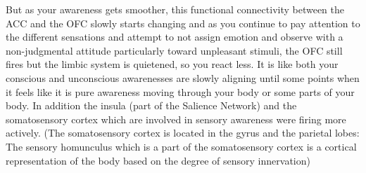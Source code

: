 \documentclass{article}
\begin{document}
But as your awareness gets smoother, this functional connectivity between the ACC and the OFC slowly starts changing and as you continue to pay attention to the different sensations and attempt to not assign emotion and observe with a non-judgmental attitude particularly toward unpleasant stimuli, the OFC still fires but the limbic system is quietened, so you react less. It is like both your conscious and unconscious awarenesses are slowly aligning until some points when it feels like it is pure awareness moving through your body or some parts of your body. In addition the insula (part of the Salience Network) and the somatosensory cortex which are involved in sensory awareness were firing more actively.
(The somatosensory cortex is located in the gyrus and the parietal lobes: The sensory homunculus which is a part of the somatosensory cortex is a cortical representation of the body based on the degree of sensory innervation)
\end{document}
